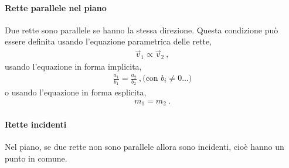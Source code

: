 \documentclass[letterpaper,10pt,italian]{jupyterBook}
\begin{document}
\paragraph{Rette parallele nel piano}
\label{\detokenize{ch/analytic_geometry/analytic_geometry_2d/lines:rette-parallele-nel-piano}}
\sphinxAtStartPar
Due rette sono parallele se hanno la stessa direzione. Questa condizione può essere definita usando l’equazione parametrica delle rette,
\begin{equation*}
\begin{split}\vec{v}_1 \propto \vec{v}_2 \ ,\end{split}
\end{equation*}
\sphinxAtStartPar
usando l’equazione in forma implicita,
\begin{equation*}
\begin{split}\frac{a_1}{b_1} = \frac{a_2}{b_2} \ , \text{(con $b_i \ne 0$...)}\end{split}
\end{equation*}
\sphinxAtStartPar
o usando l’equazione in forma esplicita,
\begin{equation*}
\begin{split}m_1 = m_2 \ .\end{split}
\end{equation*}

\paragraph{Rette incidenti}
\label{\detokenize{ch/analytic_geometry/analytic_geometry_2d/lines:rette-incidenti}}
\sphinxAtStartPar
Nel piano, se due rette non sono parallele allora sono incidenti, cioè hanno un punto in comune.
\end{document}
